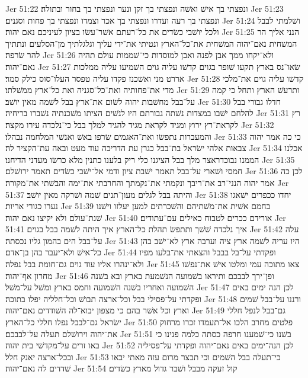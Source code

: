 Jer 51:22  ונפצתי בך אישׁ ואשׁה ונפצתי בך זקן ונער ונפצתי בך בחור ובתולה׃
Jer 51:23  ונפצתי בך רעה ועדרו ונפצתי בך אכר וצמדו ונפצתי בך פחות וסגנים׃
Jer 51:24  ושׁלמתי לבבל ולכל יושׁבי כשׂדים את כל־רעתם אשׁר־עשׂו בציון לעיניכם נאם יהוה׃
Jer 51:25  הנני אליך הר המשׁחית נאם־יהוה המשׁחית את־כל־הארץ ונטיתי את־ידי עליך וגלגלתיך מן־הסלעים ונתתיך להר שׂרפה׃
Jer 51:26  ולא־יקחו ממך אבן לפנה ואבן למוסדות כי־שׁממות עולם תהיה נאם־יהוה׃
Jer 51:27  שׂאו־נס בארץ תקעו שׁופר בגוים קדשׁו עליה גוים השׁמיעו עליה ממלכות אררט מני ואשׁכנז פקדו עליה טפסר העלו־סוס כילק סמר׃
Jer 51:28  קדשׁו עליה גוים את־מלכי מדי את־פחותיה ואת־כל־סגניה ואת כל־ארץ ממשׁלתו׃
Jer 51:29  ותרעשׁ הארץ ותחל כי קמה על־בבל מחשׁבות יהוה לשׂום את־ארץ בבל לשׁמה מאין יושׁב׃
Jer 51:30  חדלו גבורי בבל להלחם ישׁבו במצדות נשׁתה גבורתם היו לנשׁים הציתו משׁכנתיה נשׁברו בריחיה׃
Jer 51:31  רץ לקראת־רץ ירוץ ומגיד לקראת מגיד להגיד למלך בבל כי־נלכדה עירו מקצה׃
Jer 51:32  והמעברות נתפשׂו ואת־האגמים שׂרפו באשׁ ואנשׁי המלחמה נבהלו׃
Jer 51:33  כי כה אמר יהוה צבאות אלהי ישׂראל בת־בבל כגרן עת הדריכה עוד מעט ובאה עת־הקציר לה׃
Jer 51:34  אכלנו הממנו נבוכדראצר מלך בבל הציגנו כלי ריק בלענו כתנין מלא כרשׂו מעדני הדיחנו׃
Jer 51:35  חמסי ושׁארי על־בבל תאמר ישׁבת ציון ודמי אל־ישׁבי כשׂדים תאמר ירושׁלם׃
Jer 51:36  לכן כה אמר יהוה הנני־רב את־ריבך ונקמתי את־נקמתך והחרבתי את־ימה והבשׁתי את־מקורה׃
Jer 51:37  והיתה בבל לגלים מעון־תנים שׁמה ושׁרקה מאין יושׁב׃
Jer 51:38  יחדו ככפרים ישׁאגו נערו כגורי אריות׃
Jer 51:39  בחמם אשׁית את־משׁתיהם והשׁכרתים למען יעלזו וישׁנו שׁנת־עולם ולא יקיצו נאם יהוה׃
Jer 51:40  אורידם ככרים לטבוח כאילים עם־עתודים׃
Jer 51:41  איך נלכדה שׁשׁך ותתפשׂ תהלת כל־הארץ איך היתה לשׁמה בבל בגוים׃
Jer 51:42  עלה על־בבל הים בהמון גליו נכסתה׃
Jer 51:43  היו עריה לשׁמה ארץ ציה וערבה ארץ לא־ישׁב בהן כל־אישׁ ולא־יעבר בהן בן־אדם׃
Jer 51:44  ופקדתי על־בל בבבל והצאתי את־בלעו מפיו ולא־ינהרו אליו עוד גוים גם־חומת בבל נפלה׃
Jer 51:45  צאו מתוכה עמי ומלטו אישׁ את־נפשׁו מחרון אף־יהוה׃
Jer 51:46  ופן־ירך לבבכם ותיראו בשׁמועה הנשׁמעת בארץ ובא בשׁנה השׁמועה ואחריו בשׁנה השׁמועה וחמס בארץ ומשׁל על־משׁל׃
Jer 51:47  לכן הנה ימים באים ופקדתי על־פסילי בבל וכל־ארצה תבושׁ וכל־חלליה יפלו בתוכה׃
Jer 51:48  ורננו על־בבל שׁמים וארץ וכל אשׁר בהם כי מצפון יבוא־לה השׁודדים נאם־יהוה׃
Jer 51:49  גם־בבל לנפל חללי ישׂראל גם־לבבל נפלו חללי כל־הארץ׃
Jer 51:50  פלטים מחרב הלכו אל־תעמדו זכרו מרחוק את־יהוה וירושׁלם תעלה על־לבבכם׃
Jer 51:51  בשׁנו כי־שׁמענו חרפה כסתה כלמה פנינו כי באו זרים על־מקדשׁי בית יהוה׃
Jer 51:52  לכן הנה־ימים באים נאם־יהוה ופקדתי על־פסיליה ובכל־ארצה יאנק חלל׃
Jer 51:53  כי־תעלה בבל השׁמים וכי תבצר מרום עזה מאתי יבאו שׁדדים לה נאם־יהוה׃
Jer 51:54  קול זעקה מבבל ושׁבר גדול מארץ כשׂדים׃
